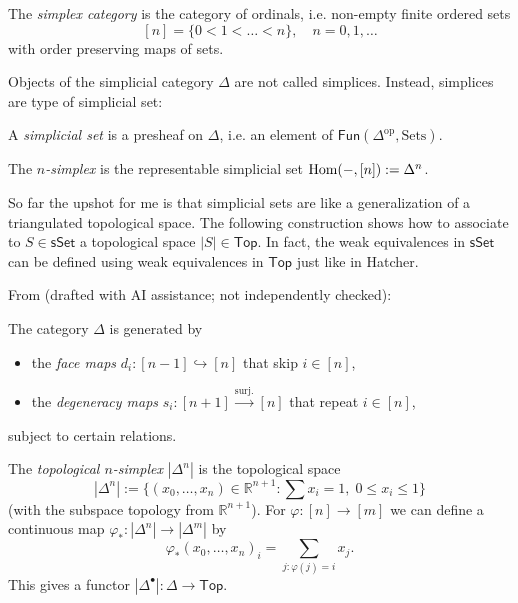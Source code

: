 \begin{definition}
\label{definition-simplex}
The {\it simplex category} is the category of
ordinals, i.e.
non-empty finite ordered sets
$$
[n]=\{0<1<\ldots<n\}, \quad n=0,1,\ldots
$$
with order preserving maps of sets.
\end{definition}

Objects of the simplicial category $\Delta$
are not called simplices.
Instead, simplices are type of simplicial
set:

\begin{definition}
\label{definition-simplicial-set}
A {\it simplicial set} is a presheaf on
$\Delta$, i.e.
an element of
$\mathsf{Fun}(\Delta^{\text{op}},\text{Sets})
$.
\end{definition}

\begin{definition}
\label{definition-simplex-duplicate-2}
The {\it $n$-simplex} is the
representable simplicial set
$\mathop{\mathrm{Hom}}\nolimits(-,[n]):=\Delta^n$.
\end{definition}

So far the upshot for me is that simplicial
sets
are like a generalization of a triangulated
topological space. The following construction
shows how to associate to $S \in
\mathsf{sSet}$
a topological space $|S|\in \mathsf{Top}$.
In fact, the weak equivalences in
$\mathsf{sSet}$
can be defined using weak equivalences
in $\mathsf{Top}$ just like in Hatcher.

\medskip\noindent
From \cite[Chapter
1]{rune}
(drafted with AI assistance; not independently checked):

The category $\Delta$ is generated by
\begin{itemize}
\item the \emph{face maps} $d_i : [n-1]
\hookrightarrow [n]$ that skip $i \in [n]$,
\item the \emph{degeneracy maps} $s_i : [n+1]
\xrightarrow{\text{surj.}} [n]$
that repeat $i \in [n]$,
\end{itemize}
subject to certain relations.

\begin{definition}
\label{definition-topological-n-simplex}
\begin{reference}
\cite[Definition 1.4.2]{rune}
\end{reference}
The {\it topological $n$-simplex}
$|\Delta^n|$ is the topological space
\[
|\Delta^n| := \{(x_0,\ldots,x_n) \in
\mathbb{R}^{n+1} : \sum x_i = 1,\; 0 \leq x_i
\leq 1\}
\]
(with the subspace topology from
$\mathbb{R}^{n+1}$).
For $\varphi:[n]\to[m]$ we can define a
continuous map
$\varphi_* : |\Delta^n| \to |\Delta^m|$ by
$$
\varphi_*(x_0,\ldots,x_n)_i =
\sum_{j:\varphi(j)=i} x_j.
$$
This gives a functor $|\Delta^\bullet| :
\Delta \to \mathsf{Top}$.
\end{definition}

